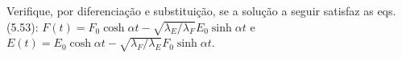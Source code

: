 Verifique, por diferenciação e substituição, se a solução a seguir satisfaz as eqs. (5.53): $F(t) = F_0 \cosh \alpha t - \sqrt{\lambda_E / \lambda_F} E_0 \sinh \alpha t$ e $E(t) = E_0 \cosh \alpha t - \sqrt{\lambda_F / \lambda_E} F_0 \sinh \alpha t$.
